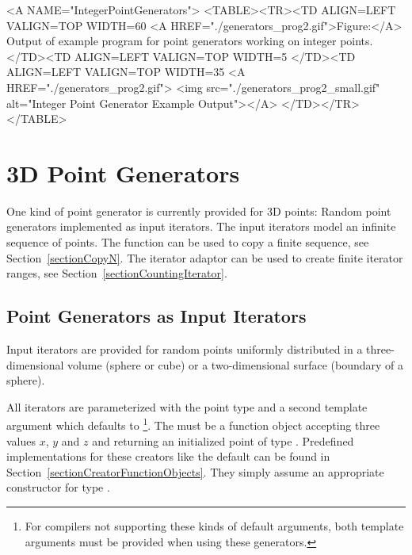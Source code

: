 
\begin{ccHtmlOnly}
  <A NAME="IntegerPointGenerators">
  <TABLE><TR><TD ALIGN=LEFT VALIGN=TOP WIDTH=60%
    <A HREF="./generators_prog2.gif">Figure:</A>
        Output of example program for point generators working
        on integer points.
  </TD><TD ALIGN=LEFT VALIGN=TOP WIDTH=5%
  </TD><TD ALIGN=LEFT VALIGN=TOP WIDTH=35%
    <A HREF="./generators_prog2.gif">
        <img src="./generators_prog2_small.gif" 
             alt="Integer Point Generator Example Output"></A>
  </TD></TR></TABLE>
\end{ccHtmlOnly}%


\newpage
\section{3D Point Generators}

One kind of point generator is currently provided for 3D points: Random point
generators implemented as input iterators.  The input iterators model
an infinite sequence of points. The function  can
be used to copy a finite sequence, see Section~\ref{sectionCopyN}. The
iterator adaptor  can be used to create
finite iterator ranges, see Section~\ref{sectionCountingIterator}.


\subsection{Point Generators as Input Iterators}

\ccDefinition

Input iterators are provided for random points uniformly distributed
in a three-dimensional volume (sphere or cube) or a two-dimensional
surface (boundary of a sphere).

All iterators are parameterized with the point type  and a second
template argument  which defaults to
\footnote{%
  For compilers not supporting these kinds of default arguments, both
  template arguments must be provided when using these generators.}.
The  must be a function object accepting three
 values $x$, $y$ and $z$ and returning an initialized
point  of type . Predefined implementations for
these creators like the default can be found in
Section~\ref{sectionCreatorFunctionObjects}.  They simply assume an
appropriate constructor for type .

